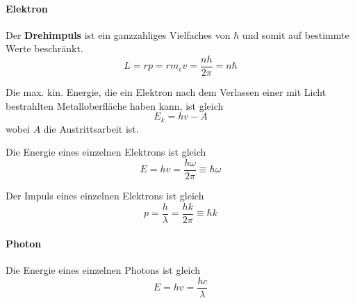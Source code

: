 \documentclass[7pt]{article}
\begin{document}
\begin{multicols}{3}
\paragraph{Elektron}

Der \textbf{Drehimpuls} ist ein ganzzahliges Vielfaches von $\hbar$ und somit auf bestimmte Werte beschränkt.
\begin{equation*}
	L = rp = rm_e v = \frac{nh}{2\pi} = n\hbar
\end{equation*}

Die max. kin. Energie, die ein Elektron nach dem Verlassen einer mit Licht bestrahlten Metalloberfläche haben kann, ist gleich
\begin{equation*}
	E_k = hv - A
\end{equation*}
wobei $A$ die Austrittsarbeit ist.

Die Energie eines einzelnen Elektrons ist gleich
\begin{equation*}
	E = hv = \frac{h\omega}{2\pi} \equiv \hbar\omega
\end{equation*}

Der Impuls eines einzelnen Elektrons ist gleich
\begin{equation*}
	p = \frac{h}{\lambda} = \frac{hk}{2\pi} \equiv \hbar k
\end{equation*}

\paragraph{Photon}

Die Energie eines einzelnen Photons ist gleich
\begin{equation*}
	E = hv = \frac{hc}{\lambda}
\end{equation*}

\end{multicols}
\end{document}

